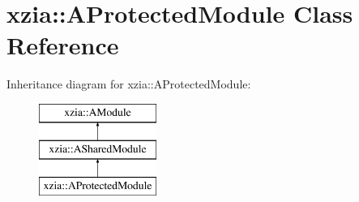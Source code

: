 \hypertarget{classxzia_1_1AProtectedModule}{}\section{xzia\+:\+:A\+Protected\+Module Class Reference}
\label{classxzia_1_1AProtectedModule}
Inheritance diagram for xzia\+:\+:A\+Protected\+Module\+:\begin{figure}[H]
\begin{center}
\leavevmode
\includegraphics[height=3.000000cm]{classxzia_1_1AProtectedModule}
\end{center}
\end{figure}
